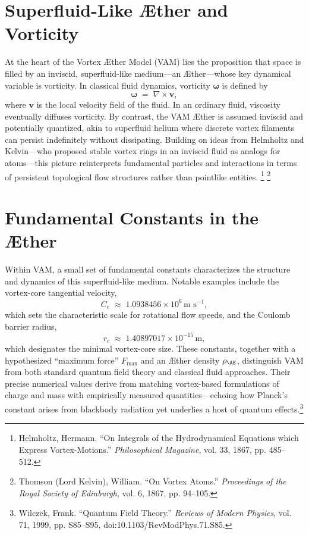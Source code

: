 
\section{Superfluid-Like Æther and Vorticity}

At the heart of the Vortex Æther Model (VAM) lies the proposition that space is filled by an inviscid, superfluid-like medium—an Æther—whose key dynamical variable is vorticity. In classical fluid dynamics, vorticity \(\boldsymbol{\omega}\) is defined by
\[
    \boldsymbol{\omega} \;=\; \nabla \times \mathbf{v},
\]
where \(\mathbf{v}\) is the local velocity field of the fluid. In an ordinary fluid, viscosity eventually diffuses vorticity. By contrast, the VAM Æther is assumed inviscid and potentially quantized, akin to superfluid helium where discrete vortex filaments can persist indefinitely without dissipating. Building on ideas from Helmholtz and Kelvin—who proposed stable vortex rings in an inviscid fluid as analogs for atoms—this picture reinterprets fundamental particles and interactions in terms of persistent topological flow structures rather than pointlike entities.
\footnote{Helmholtz, Hermann. “On Integrals of the Hydrodynamical Equations which Express Vortex-Motions.” \textit{Philosophical Magazine}, vol. 33, 1867, pp. 485–512.}
\footnote{Thomson (Lord Kelvin), William. “On Vortex Atoms.” \textit{Proceedings of the Royal Society of Edinburgh}, vol. 6, 1867, pp. 94–105.}

\section{Fundamental Constants in the Æther}

Within VAM, a small set of fundamental constants characterizes the structure and dynamics of this superfluid-like medium. Notable examples include the vortex-core tangential velocity,
\[
    C_{e} \;\approx\; 1.0938456 \times 10^{6} \, \text{m s}^{-1},
\]
which sets the characteristic scale for rotational flow speeds, and the Coulomb barrier radius,
\[
    r_{c} \;\approx\; 1.40897017 \times 10^{-15} \, \text{m},
\]
which designates the minimal vortex-core size. These constants, together with a hypothesized “maximum force” \(F_{\text{max}}\) and an Æther density \(\rho_{\mathrm{\AE}}\), distinguish VAM from both standard quantum field theory and classical fluid approaches. Their precise numerical values derive from matching vortex-based formulations of charge and mass with empirically measured quantities—echoing how Planck’s constant arises from blackbody radiation yet underlies a host of quantum effects.\footnote{Wilczek, Frank. “Quantum Field Theory.” \textit{Reviews of Modern Physics}, vol. 71, 1999, pp. S85–S95, doi:10.1103/RevModPhys.71.S85.}

